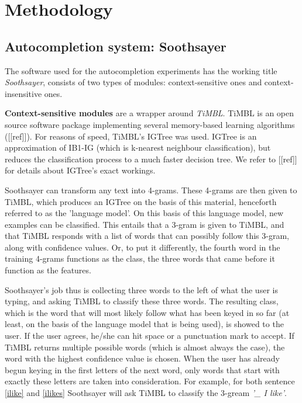 \documentclass[12pt]{article}
\begin{document}
\section{Methodology}

\subsection{Autocompletion system: Soothsayer}

The software used for the autocompletion experiments has the working title \emph{Soothsayer}, consists of two types of modules: context-sensitive ones and context-insensitive ones. 

\textbf{Context-sensitive modules} are a wrapper around \emph{TiMBL}. TiMBL is an open source software package implementing several memory-based learning algorithms ([[ref]]). For reasons of speed, TiMBL's IGTree was used. IGTree is an approximation of IB1-IG (which is k-nearest neighbour classification), but reduces the classification process to a much faster decision tree. We refer to [[ref]] for details about IGTree's exact workings.

Soothsayer can transform any text into 4-grams. These 4-grams are then given to TiMBL, which produces an IGTree on the basis of this material, henceforth referred to as the 'language model'. On this basis of this language model, new examples can be classified. This entails that a 3-gram is given to TiMBL, and that TiMBL responds with a list of words that can possibly follow this 3-gram, along with confidence values. Or, to put it differently, the fourth word in the training 4-grams functions as the class, the three words that came before it function as the features.

Soothsayer's job thus is collecting three words to the left of what the user is typing, and asking TiMBL to classify these three words. The resulting class, which is the word that will most likely follow what has been keyed in so far (at least, on the basis of the language model that is being used), is showed to the user. If the user agrees, he/she can hit space or a punctuation mark to accept. If TiMBL returns multiple possible words (which is almost always the case), the word with the highest confidence value is chosen. When the user has already begun keying in the first letters of the next word, only words that start with exactly these letters are taken into consideration. For example, for both sentence \ref{ilike} and \ref{ilikes} Soothsayer will ask TiMBL to classify the 3-gream \emph{'\_ I like'}.
\end{document}
